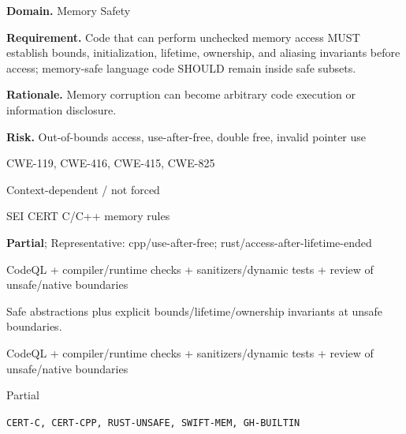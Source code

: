 \documentclass[10pt,letterpaper]{article}
\newcommand{\prioritybadge}[2]{\tcbox[on line,boxrule=0pt,arc=1.2mm,boxsep=0.7mm,left=1mm,right=1mm,top=0.4mm,bottom=0.4mm,colback=#2!12,coltext=#2]{\scriptsize\bfseries #1}}
\begin{document}
\begin{rulebox}[title={\texttt{SCS-ALL-MEM-001} \hfill \prioritybadge{Critical Control}{Critical}}]
\textbf{Domain.} Memory Safety

\textbf{Requirement.} Code that can perform unchecked memory access MUST establish bounds, initialization, lifetime, ownership, and aliasing invariants before access; memory-safe language code SHOULD remain inside safe subsets.

\textbf{Rationale.} Memory corruption can become arbitrary code execution or information disclosure.

\textbf{Risk.} Out-of-bounds access, use-after-free, double free, invalid pointer use

\begin{description}[leftmargin=2.65cm,labelwidth=2.3cm,style=nextline,itemsep=1pt,topsep=3pt]
  \item[CWE] CWE-119, CWE-416, CWE-415, CWE-825
  \item[OWASP] Context-dependent / not forced
  \item[CERT] SEI CERT C/C++ memory rules
  \item[CodeQL] \textbf{Partial}; Representative: cpp/use-after-free; rust/access-after-lifetime-ended
  \item[Enforcement] CodeQL + compiler/runtime checks + sanitizers/dynamic tests + review of unsafe/native boundaries
  \item[Prevention] Safe abstractions plus explicit bounds/lifetime/ownership invariants at unsafe boundaries.
  \item[Verification] CodeQL + compiler/runtime checks + sanitizers/dynamic tests + review of unsafe/native boundaries
  \item[Automation] Partial
  \item[Sources] \texttt{CERT-C, CERT-CPP, RUST-UNSAFE, SWIFT-MEM, GH-BUILTIN}
\end{description}
\end{rulebox}
\end{document}
